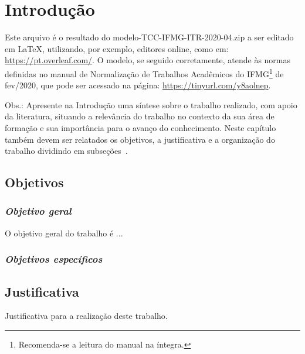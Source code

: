 \chapter{Introdução} \label{Introducao}

Este arquivo é o resultado do modelo-TCC-IFMG-ITR-2020-04.zip a ser editado em LaTeX, utilizando, por exemplo, editores online, como em: \url{https://pt.overleaf.com/}. O modelo, se seguido corretamente, atende às normas definidas no manual de Normalização de Trabalhos Acadêmicos do IFMG\footnote{Recomenda-se a leitura do manual na íntegra.} de fev/2020, que pode ser acessado na página: \url{https://tinyurl.com/y8aolnep}. 

Obs.: Apresente na Introdução uma síntese sobre o trabalho realizado, com apoio da literatura, situando a relevância do trabalho no contexto da sua área de formação e sua importância para o avanço do conhecimento. Neste capítulo também devem ser relatados os objetivos, a justificativa e a organização do trabalho dividindo em subseções~\cite{loboguia}. 

\section{Objetivos}

\subsection{\textit{Objetivo geral}}

O objetivo geral do trabalho é ...

\subsection{\textit{Objetivos específicos}}

\section{Justificativa}

Justificativa para a realização deste trabalho.

